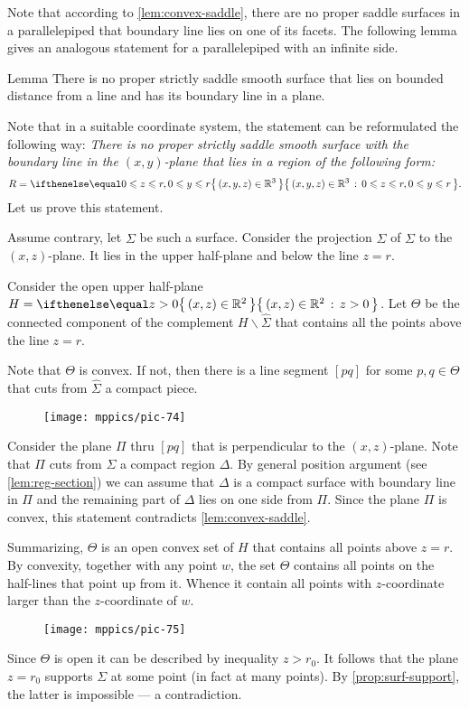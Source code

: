Note that according to \ref{lem:convex-saddle}, there are no proper saddle surfaces in a parallelepiped that boundary line lies on one of its facets.
The following lemma gives an analogous statement for a parallelepiped with an infinite side.

\begin{thm}{Lemma}\label{lem:region}
There is no proper strictly saddle smooth surface that lies on bounded distance from a line
and has its boundary line in a plane.
\end{thm}


Note that in a suitable coordinate system, the statement can be reformulated the following way:
\emph{There is no proper strictly saddle smooth surface 
with the boundary line in the $(x,y)$-plane
that lies in a region of the following form:}
\[R=\set{(x,y,z)\in\RR^3}{0\le z\le r, 0\le y\le r}.\]
Let us prove this statement.

Assume contrary, let $\Sigma$ be such a surface.
Consider the projection $\hat \Sigma$ of $\Sigma$ to the $(x,z)$-plane.
It lies in the upper half-plane and below the line $z=r$.

Consider the open upper half-plane $H=\set{(x,z)\in \RR^2}{z> 0}$. 
Let $\Theta$ be the connected component of the complement $H\backslash \hat \Sigma$ that contains all the points above the line $z=r$.

Note that $\Theta$ is convex.
If not, then there is a line segment $[pq]$ for some $p,q\in \Theta$ that cuts from $\hat\Sigma$ a compact piece.
\begin{figure}[h!]
\vskip-0mm
\centering
\texttt{[image: mppics/pic-74]}
\vskip0mm
\end{figure}
Consider the plane $\Pi$ thru $[pq]$ that is perpendicular to the $(x,z)$-plane.
Note that $\Pi$ cuts from $\Sigma$ a compact region $\Delta$.
By general position argument (see \ref{lem:reg-section}) 
we can assume that $\Delta$ is a compact surface with boundary line in $\Pi$ and the remaining part of $\Delta$ lies on one side from $\Pi$.
Since the plane $\Pi$ is convex, this statement contradicts \ref{lem:convex-saddle}.

Summarizing, $\Theta$ is an open convex set of $H$ that contains all points above $z=r$.
By convexity, together with any point $w$, the set $\Theta$ contains all points on the half-lines that point up from it. 
Whence it contain all points with $z$-coordinate larger than the $z$-coordinate of $w$.
\begin{figure}[h!]
\vskip-0mm
\centering
\texttt{[image: mppics/pic-75]}
\vskip0mm
\end{figure}
Since $\Theta$ is open it can be described by inequality $z>r_0$.
It follows that the plane $z=r_0$ supports $\Sigma$ at some point (in fact at many points).
By \ref{prop:surf-support}, the latter is impossible --- a contradiction.
\qeds

